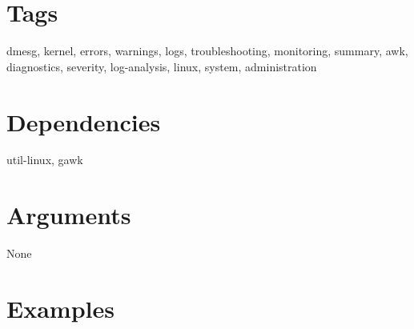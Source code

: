 \documentclass{article}
\begin{document}
\section*{Tags}
dmesg, kernel, errors, warnings, logs, troubleshooting, monitoring, summary, awk, diagnostics, severity, log-analysis, linux, system, administration

\section*{Dependencies}
util-linux, gawk


\section*{Arguments}
None

\section*{Examples}
\end{document}
